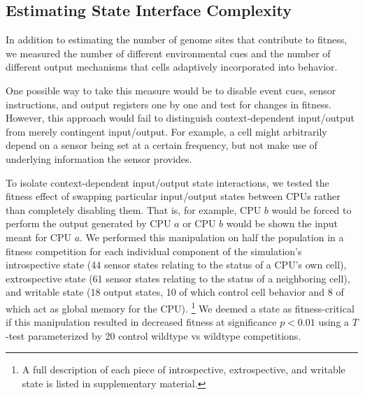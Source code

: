 

\subsection{Estimating State Interface Complexity}
\label{sec:estimating-state-interface-complexity;ch:measuring-cna}

In addition to estimating the number of genome sites that contribute to fitness, we measured the number of different environmental cues and the number of different output mechanisms that cells adaptively incorporated into behavior.

One possible way to take this measure would be to disable event cues, sensor instructions, and output registers one by one and test for changes in fitness.
However, this approach would fail to distinguish context-dependent input/output from merely contingent input/output.
For example, a cell might arbitrarily depend on a sensor being set at a certain frequency, but not make use of underlying information the sensor provides.

To isolate context-dependent input/output state interactions, we tested the fitness effect of swapping particular input/output states between CPUs rather than completely disabling them.
That is, for example, CPU $b$ would be forced to perform the output generated by CPU $a$ or CPU $b$ would be shown the input meant for CPU $a$.
We performed this manipulation on half the population in a fitness competition for each individual component of the simulation's introspective state (44 sensor states relating to the status of a CPU's own cell), extrospective state (61 sensor states relating to the status of a neighboring cell), and writable state (18 output states, 10 of which control cell behavior and 8 of which act as global memory for the CPU).%
\footnote{
A full description of each piece of introspective, extrospective, and writable state is listed in supplementary material.
}
We deemed a state as fitness-critical if this manipulation resulted in decreased fitness at significance $p < 0.01$ using a $T$-test parameterized by 20 control wildtype vs wildtype competitions.

